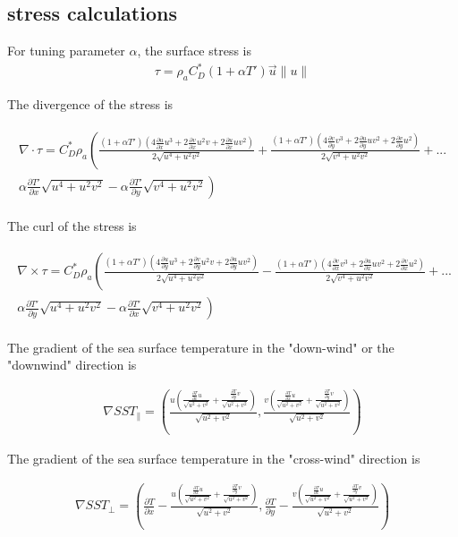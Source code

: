 \documentclass[12pt,a4paper]{article}
\newcommand{\dudx}{\frac{\partial u}{\partial x}}
\newcommand{\dudy}{\frac{\partial u}{\partial y}}
\newcommand{\dvdx}{\frac{\partial v}{\partial x}}
\newcommand{\dvdy}{\frac{\partial v}{\partial y}}
\newcommand{\dTdx}{\frac{\partial T}{\partial x}}
\newcommand{\dTdy}{\frac{\partial T}{\partial y}}
\newcommand{\dTpdx}{\frac{\partial T'}{\partial x}}
\newcommand{\dTpdy}{\frac{\partial T'}{\partial y}}
\begin{document}
\subsection{stress calculations}
For tuning parameter $\alpha$, the surface stress is 
\begin{align*}
\tau = \rho_a C_D^*(1+\alpha T')\vec{u}\lVert u \rVert
\end{align*}

The divergence of the stress is 

\begin{align*}
\begin{split}
\nabla \cdot \tau = C_D^* \rho_a \left( \frac{(1+\alpha T')(4\dudx u^3 + 2 \dvdx u^2 v + 2 \dudx u v^2)}{2\sqrt{u^4+u^2v^2}}+ \frac{(1+\alpha T')(4\dvdy v^3 + 2 \dudy u v^2 + 2 \dvdy u^2)}{2\sqrt{v^4+u^2v^2}}\right.+...\\
\left. \alpha\dTpdx\sqrt{u^4+u^2v^2}-\alpha\dTpdy\sqrt{v^4+u^2v^2} \right)
\end{split}
\end{align*}

The curl of the stress is 

\begin{align*}
\begin{split}
\nabla \times \tau = C_D^* \rho_a \left( \frac{(1+\alpha T')(4\dudy u^3 + 2 \dvdy u^2 v + 2 \dudy u v^2)}{2\sqrt{u^4+u^2v^2}}- \frac{(1+\alpha T')(4\dvdx v^3 + 2 \dudx u v^2 + 2 \dvdx u^2)}{2\sqrt{v^4+u^2v^2}}\right.+...\\
\left. \alpha\dTpdy\sqrt{u^4+u^2v^2}-\alpha\dTpdx\sqrt{v^4+u^2v^2} \right)
\end{split}
\end{align*}

The gradient of the sea surface temperature in the "down-wind" or the "downwind" direction is

\begin{align*}
\nabla SST_{\parallel} = \left( \frac{u\left( \frac{\dTdx u}{\sqrt{u^2+v^2}} + \frac{\dTdy v}{\sqrt{u^2+v^2}}\right)}{\sqrt{u^2+v^2}} ,  \frac{v\left( \frac{\dTdx u}{\sqrt{u^2+v^2}} + \frac{\dTdy v}{\sqrt{u^2+v^2}}\right)}{\sqrt{u^2+v^2}} \right)
\end{align*}

The gradient of the sea surface temperature in the "cross-wind" direction is

\begin{align*}
\nabla SST_{\bot} = \left(\dTdx- \frac{u\left( \frac{\dTdx u}{\sqrt{u^2+v^2}} + \frac{\dTdy v}{\sqrt{u^2+v^2}}\right)}{\sqrt{u^2+v^2}} , \dTdy- \frac{v\left( \frac{\dTdx u}{\sqrt{u^2+v^2}} + \frac{\dTdy v}{\sqrt{u^2+v^2}}\right)}{\sqrt{u^2+v^2}} \right)
\end{align*}
\end{document}
